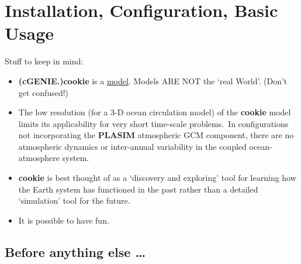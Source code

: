 
\cleardoublepage


\setcounter{chapter}{-1}
\chapter{Installation, Configuration, Basic Usage}\label{ch:0}

\hfill \break

\vspace{16mm}

\noindent Stuff to keep in mind:

\vspace{2mm}

\begin{itemize}
\item \textbf{(cGENIE.)cookie} is a \uline{model}. Models ARE NOT the ‘real World’. (Don’t get confused!)
\item The  low resolution (for a 3-D ocean circulation model) of the \textbf{cookie} model limits its applicability for very short time-scale problems.\ In configurations not incorporating the \textbf{PLASIM} atmospheric GCM component, there are no atmospheric dynamics or inter-annual variability in the coupled ocean-atmosphere system.
\item \textbf{cookie} is best thought of as a ‘discovery and exploring’ tool for learning how the Earth system has functioned in the past rather than a detailed ‘simulation’ tool for the future.
\item It is possible to have fun.
\end{itemize}

\newpage

\section{Before anything else …}



